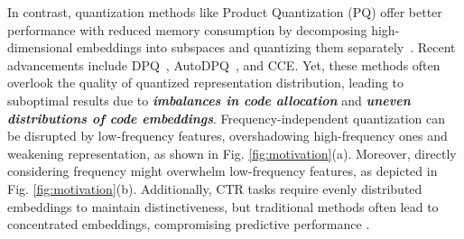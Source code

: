     In contrast, quantization methods like Product Quantization (PQ) \cite{PQ} offer better performance with reduced memory consumption by decomposing high-dimensional embeddings into subspaces and quantizing them separately~\cite{other_17_guesr}. 
    Recent advancements include DPQ~\cite{DPQ}, AutoDPQ~\cite{AutoDPQ}, and CCE\cite{CCE}. 
    Yet, these methods often overlook the quality of quantized representation distribution, leading to suboptimal results due to \textsl{\textbf{imbalances in code allocation}} and \textsl{\textbf{uneven distributions of code embeddings}}. 
    Frequency-independent quantization can be disrupted by low-frequency features, overshadowing high-frequency ones and weakening representation, as shown in Fig. \ref{fig:motivation}(a). 
    Moreover, directly considering frequency might overwhelm low-frequency features, as depicted in Fig. \ref{fig:motivation}(b). 
    Additionally, CTR tasks require evenly distributed embeddings to maintain distinctiveness, but traditional methods often lead to concentrated embeddings, compromising predictive performance \cite{letter}.




